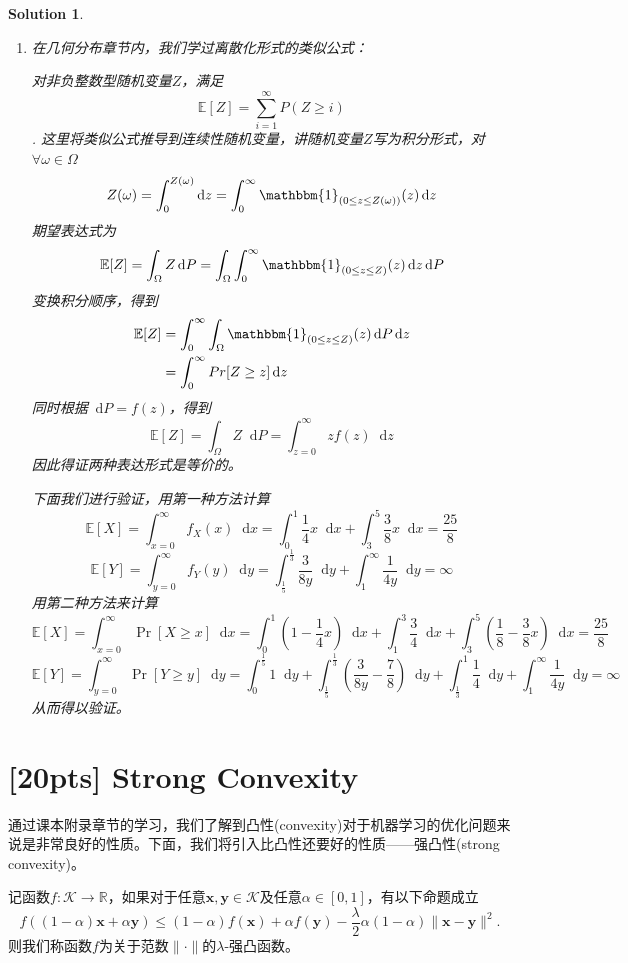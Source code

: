 \documentclass[a4paper,UTF8]{article}
\numberwithin{equation}{section}
\newtheorem*{mySol}{Solution}
\newcommand*\diff{\mathop{}\!\mathrm{d}}
\begin{document}
\begin{mySol}
\begin{enumerate}[ {(}1{)}]
\item 在几何分布章节内，我们学过离散化形式的类似公式：

对非负整数型随机变量$Z$，满足
\[ \mathbb{E}[Z] = \sum_{i=1}^{\infty} P (Z \geq i) \].
这里将类似公式推导到连续性随机变量，讲随机变量$Z$写为积分形式，对$\forall \omega \in \Omega$ 
\[ Z(\omega) = \int_{0}^{Z(\omega)} \diff z = \int_{0}^{\infty} \mathbbm{1}_{(0\leq z \leq Z(\omega))}(z) \diff z \] 
期望表达式为
\begin{align*}
\mathbb{E}[Z]  = \int_{\Omega} Z \diff P = \int_{\Omega} \int_{0}^{\infty} \mathbbm{1}_{(0\leq z \leq Z)}(z) \diff z \diff P
\end{align*}
变换积分顺序，得到
\begin{align*}
\mathbb{E}[Z] &  =\int_{0}^{\infty} \int_{\Omega}  \mathbbm{1}_{(0\leq z \leq Z)}(z)  \diff P \diff z \\
& = \int_{0}^{\infty} Pr[Z \geq z] \diff z
\end{align*}
同时根据$\diff P = f(z)$，得到
\[ \mathbb{E}[Z] = \int_{\Omega} Z \diff P = \int_{z=0}^{\infty}zf(z) \diff z \]
因此得证两种表达形式是等价的。


下面我们进行验证，用第一种方法计算
\[ \mathbb{E}[X] = \int_{x=0}^{\infty} f_X(x) \diff x=   \int_{0}^{1} \frac{1}{4}x \diff x + \int_{3}^{5} \frac{3}{8}x \diff x = \frac{25}{8} \]
\[\mathbb{E}[Y] = \int_{y=0}^{\infty} f_Y(y) \diff y=   \int_{\frac{1}{5}}^{\frac{1}{3}} \frac{3}{8y} \diff y+ \int_{1}^{\infty} \frac{1}{4y} \diff y = \infty  \]
用第二种方法来计算
\[ \mathbb{E}[X] = \int_{x=0}^{\infty}\Pr[X\geq x] \diff x =  \int_{0}^{1} (1-\frac{1}{4}x) \diff x + \int_{1}^{3} \frac{3}{4} \diff x + \int_{3}^{5} (\frac{1}{8} - \frac{3}{8}x) \diff x = \frac{25}{8} \]
\[ \mathbb{E}[Y] = \int_{y=0}^{\infty}\Pr[Y\geq y] \diff y =  \int_{0}^{\frac{1}{5}} 1 \diff y + \int_{\frac{1}{5}}^{\frac{1}{3}} (\frac{3}{8y}-\frac{7}{8}) \diff y + \int_{\frac{1}{3}}^{1}\frac{1}{4} \diff y + \int_{1}^{\infty} \frac{1}{4y} \diff y= \infty \] 
从而得以验证。




\end{enumerate}
\end{mySol}

\newpage

\section{[20pts] Strong Convexity}
通过课本附录章节的学习，我们了解到凸性(convexity)对于机器学习的优化问题来说是非常良好的性质。下面，我们将引入比凸性还要好的性质——强凸性(strong convexity)。
\begin{def-box}[强凸性]
记函数$f: \mathcal{K} \rightarrow \mathbb{R}$，如果对于任意$\mathbf{x}, \mathbf{y} \in \mathcal{K}$及任意$\alpha\in[0,1]$，有以下命题成立
\begin{equation}
  \label{eq-sc-1}
  f((1-\alpha)\mathbf{x} + \alpha\mathbf{y})\leq (1-\alpha)f(\mathbf{x}) + \alpha f(\mathbf{y}) - \frac{\lambda}{2}\alpha(1-\alpha)\lVert \mathbf{x} - \mathbf{y}\rVert^2.
\end{equation}
则我们称函数$f$为关于范数$\lVert \cdot \rVert$的$\lambda$-强凸函数。
\end{def-box}
\end{document}
